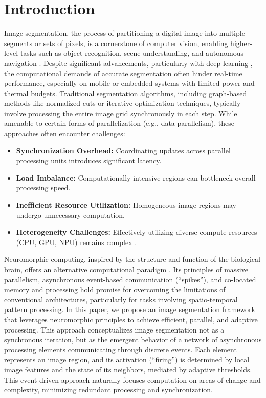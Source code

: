 \documentclass[conference]{IEEEtran}
\begin{document}
\section{Introduction}
Image segmentation, the process of partitioning a digital image into multiple segments or sets of pixels, is a cornerstone of computer vision, enabling higher-level tasks such as object recognition, scene understanding, and autonomous navigation \cite{Haralick1985}. Despite significant advancements, particularly with deep learning \cite{Minaee2021, Long2015, Ronneberger2015}, the computational demands of accurate segmentation often hinder real-time performance, especially on mobile or embedded systems with limited power and thermal budgets.
Traditional segmentation algorithms, including graph-based methods like normalized cuts \cite{Shi2000} or iterative optimization techniques, typically involve processing the entire image grid synchronously in each step. While amenable to certain forms of parallelization (e.g., data parallelism), these approaches often encounter challenges:
\begin{itemize}
\item \textbf{Synchronization Overhead:} Coordinating updates across parallel processing units introduces significant latency.
\item \textbf{Load Imbalance:} Computationally intensive regions can bottleneck overall processing speed.
\item \textbf{Inefficient Resource Utilization:} Homogeneous image regions may undergo unnecessary computation.
\item \textbf{Heterogeneity Challenges:} Effectively utilizing diverse compute resources (CPU, GPU, NPU) remains complex \cite{Christensen2022}.
\end{itemize}
Neuromorphic computing, inspired by the structure and function of the biological brain, offers an alternative computational paradigm \cite{Mead1990, Davies2018, Akopyan2015}. Its principles of massive parallelism, asynchronous event-based communication (``spikes''), and co-located memory and processing hold promise for overcoming the limitations of conventional architectures, particularly for tasks involving spatio-temporal pattern processing.
In this paper, we propose an image segmentation framework that leverages neuromorphic principles to achieve efficient, parallel, and adaptive processing. This approach conceptualizes image segmentation not as a synchronous iteration, but as the emergent behavior of a network of asynchronous processing elements communicating through discrete events. Each element represents an image region, and its activation (``firing'') is determined by local image features and the state of its neighbors, mediated by adaptive thresholds. This event-driven approach naturally focuses computation on areas of change and complexity, minimizing redundant processing and synchronization.
\end{document}

